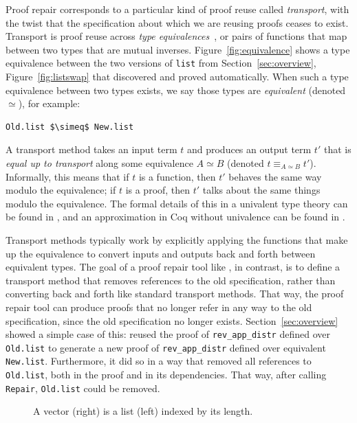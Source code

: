Proof repair corresponds to a particular kind of proof reuse called \textit{transport},
with the twist that the specification about which we are reusing proofs ceases to exist.
Transport is proof reuse across \textit{type equivalences}~\cite{univalent2013homotopy},
or pairs of functions that map between two types that are mutual inverses.
Figure~\ref{fig:equivalence} shows a type equivalence between the two versions of \lstinline{list}
from Section~\ref{sec:overview}, Figure~\ref{fig:listswap} that \toolname discovered and proved automatically.
When such a type equivalence between two types exists, we say those types are \textit{equivalent} (denoted $\simeq$), for example:

\begin{lstlisting}
Old.list $\simeq$ New.list
\end{lstlisting}

A transport method takes an input term $t$ and produces an output term $t'$ that is \textit{equal up to transport}
along some equivalence $A \simeq B$ (denoted $t \equiv_{A \simeq B} t'$). Informally, this means that if $t$ is a function, then $t'$ behaves the same way modulo the equivalence;
if $t$ is a proof, then $t'$ talks about the same things modulo the equivalence.
The formal details of this in a univalent type theory can be found in \citet{univalent2013homotopy}, and an approximation in Coq
without univalence can be found in \citet{tabareau2017equivalences}.

Transport methods typically work by explicitly applying the functions that make up the equivalence to convert
inputs and outputs back and forth between equivalent types.
The goal of a proof repair tool like \toolname, in contrast, is to define a transport method that
removes references to the old specification, rather than converting back and forth like standard transport methods.
That way, the proof repair tool can produce proofs that no longer refer in any way to the old specification,
since the old specification no longer exists.
Section~\ref{sec:overview} showed a simple case of this: \toolname
reused the proof of \lstinline{rev_app_distr} defined over \lstinline{Old.list}
to generate a new proof of \lstinline{rev_app_distr} defined over equivalent \lstinline{New.list}.
Furthermore, it did so in a way that removed all references to \lstinline{Old.list}, both in the proof
and in its dependencies.
That way, after calling \lstinline{Repair}, \lstinline{Old.list} could be removed.

\begin{figure}
\begin{minipage}{0.40\textwidth}
   
\end{minipage}
\hfill
\begin{minipage}{0.58\textwidth}
   
\end{minipage}
\vspace{-0.2cm}
\caption{A vector (right) is a list (left) indexed by its length.}
\label{fig:listtovect}
\end{figure}

